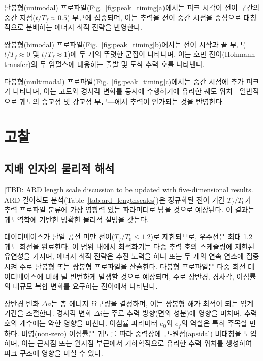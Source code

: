 \documentclass[a4paper,fleqn]{cas-dc}
\let\origsubsection\subsection
\renewcommand{\subsection}{\FloatBarrier\origsubsection}
\begin{document}
단봉형(unimodal) 프로파일(Fig.~\ref{fig:peak_timing}a)에서는 피크 시각이 전이 구간의 중간 지점($t/T_f \approx 0.5$) 부근에 집중되며, 이는 추력을 전이 중간 시점을 중심으로 대칭적으로 분배하는 에너지 최적 전략을 반영한다.

쌍봉형(bimodal) 프로파일(Fig.~\ref{fig:peak_timing}b)에서는 전이 시작과 끝 부근($t/T_f \approx 0$ 및 $t/T_f \approx 1$)에 두 개의 뚜렷한 군집이 나타나며, 이는 호만 전이(Hohmann transfer)의 두 임펄스에 대응하는 출발 및 도착 추력 호를 나타낸다.

다봉형(multimodal) 프로파일(Fig.~\ref{fig:peak_timing}c)에서는 중간 시점에 추가 피크가 나타나며, 이는 고도와 경사각 변화를 동시에 수행하기에 유리한 궤도 위치---일반적으로 궤도의 승교점 및 강교점 부근---에서 추력이 인가되는 것을 반영한다.


\section{고찰}\label{sec:discussion}

\subsection{지배 인자의 물리적 해석}\label{subsec:physical_interpretation}

[TBD: ARD length scale discussion to be updated with five-dimensional results.] ARD 길이척도 분석(Table~\ref{tab:ard_lengthscales})은 정규화된 전이 기간 $T_f/T_0$가 추력 프로파일 분류에 가장 영향력 있는 파라미터로 남을 것으로 예상된다. 이 결과는 궤도역학에 기반한 명확한 물리적 설명을 갖는다.

데이터베이스가 단일 공전 미만 전이($T_f/T_0 \leq 1.2$)로 제한되므로, 우주선은 최대 1.2 궤도 회전을 완료한다. 이 범위 내에서 최적화기는 다중 추력 호의 스케줄링에 제한된 유연성을 가지며, 에너지 최적 전략은 추진 노력을 하나 또는 두 개의 연속 연소에 집중시켜 주로 단봉형 또는 쌍봉형 프로파일을 산출한다. 다봉형 프로파일은 다중 회전 데이터베이스에 비해 덜 빈번하게 발생할 것으로 예상되며, 주로 장반경, 경사각, 이심률의 대규모 복합 변화를 요구하는 전이에서 나타난다.

장반경 변화 $\Delta a$는 총 에너지 요구량을 결정하며, 이는 쌍봉형 해가 최적이 되는 임계 기간을 조절한다. 경사각 변화 $\Delta i$는 주로 추력 방향(면외 성분)에 영향을 미치며, 추력 호의 개수에는 약한 영향을 미친다. 이심률 파라미터 $e_0$와 $e_f$의 역할은 특히 주목할 만하다. 비영(non-zero) 이심률은 궤도를 따라 중력장에 근-원점(apsidal) 비대칭을 도입하며, 이는 근지점 또는 원지점 부근에서 기하학적으로 유리한 추력 위치를 생성하여 피크 구조에 영향을 미칠 수 있다.
\end{document}
